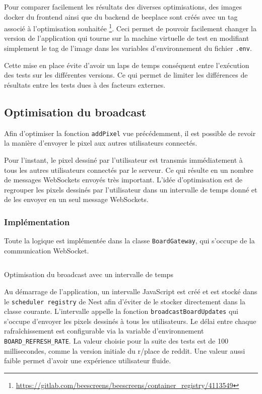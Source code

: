 Pour comparer facilement les résultats des diverses optimisations, des images \gls{docker} du frontend ainsi que du backend de \gls{beeplace} sont créés avec un tag associé à l'optimisation souhaitée \footnote{\url{https://gitlab.com/beescreens/beescreens/container_registry/4113549}}. Ceci permet de pouvoir facilement changer la version de l'application qui tourne sur la machine virtuelle de test en modifiant simplement le tag de l'image dans les variables d'environnement du fichier \texttt{.env}.

Cette mise en place évite d'avoir un laps de temps conséquent entre l'exécution des tests sur les différentes versions. Ce qui permet de limiter les différences de résultats entre les tests dues à des facteurs externes.

\subsection{Optimisation du broadcast}

Afin d'optimiser la fonction \texttt{addPixel} vue précédemment, il est possible de revoir la manière d'envoyer le pixel aux autres utilisateurs connectés.

Pour l'instant, le pixel dessiné par l'utilisateur est transmis immédiatement à tous les autres utilisateurs connectés par le serveur. Ce qui résulte en un nombre de messages WebSockets envoyés très important. L'idée d'optimisation est de regrouper les pixels dessinés par l'utilisateur dans un intervalle de temps donné et de les envoyer en un seul message WebSockets.

\subsubsection{Implémentation}

Toute la logique est implémentée dans la classe \texttt{BoardGateway}, qui s'occupe de la communication WebSocket.

\begin{listing}[H]
  \inputminted[highlightlines={3,12,18,19,29},linenos]{ts}{assets/figures/opti-interval.ts}
  \caption{Optimisation du broadcast avec un intervalle de temps}
  \label{listing:opti-interval}
\end{listing}

Au démarrage de l'application, un intervalle JavaScript est créé et est stocké dans le \texttt{scheduler registry} de Nest afin d'éviter de le stocker directement dans la classe courante. L'intervalle appelle la fonction \texttt{broadcastBoardUpdates} qui s'occupe d'envoyer les pixels dessinés à tous les utilisateurs. Le délai entre chaque rafraîchissement est configurable via la variable d'environnement \texttt{BOARD\_REFRESH\_RATE}. La valeur choisie pour la suite des tests est de 100 millisecondes, comme la version initiale du r/place de \gls{reddit}. Une valeur aussi faible permet d'avoir une expérience utilisateur fluide.


